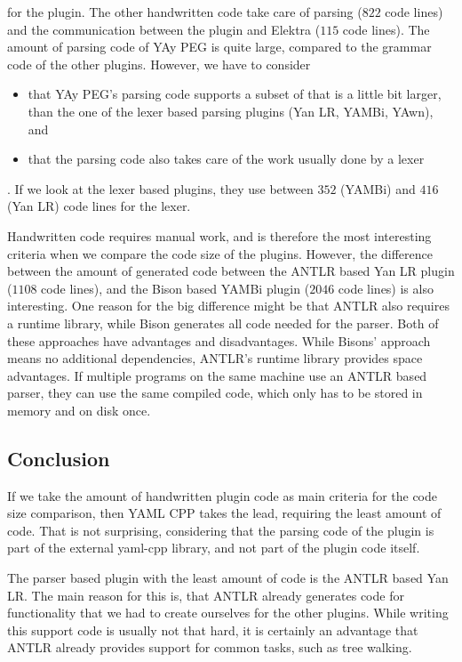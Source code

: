 for the plugin. The other handwritten code take care of parsing ($822$ code lines) and the communication between the plugin and Elektra ($115$ code lines). The amount of parsing code of YAy PEG is quite large, compared to the grammar code of the other plugins. However, we have to consider

\begin{itemize}
  \item that YAy PEG’s parsing code supports a subset of  that is a little bit larger, than the one of the lexer based parsing plugins (Yan LR, YAMBi, YAwn), and
  \item that the parsing code also takes care of the work usually done by a lexer
\end{itemize}

. If we look at the lexer based plugins, they use between $352$ (YAMBi) and $416$ (Yan LR) code lines for the lexer.

Handwritten code requires manual work, and is therefore the most interesting criteria when we compare the code size of the plugins. However, the difference between the amount of generated code between the ANTLR based Yan LR plugin ($1108$ code lines), and the Bison based YAMBi plugin ($2046$ code lines) is also interesting. One reason for the big difference might be that ANTLR also requires a runtime library, while Bison generates all code needed for the parser. Both of these approaches have advantages and disadvantages. While Bisons’ approach means no additional dependencies, ANTLR’s runtime library provides space advantages. If multiple programs on the same machine use an ANTLR based parser, they can use the same compiled code, which only has to be stored in memory and on disk once.

\subsection{Conclusion}

If we take the amount of handwritten plugin code as main criteria for the code size comparison, then YAML CPP takes the lead, requiring the least amount of code. That is not surprising, considering that the parsing code of the plugin is part of the external yaml-cpp library, and not part of the plugin code itself.

The parser based plugin with the least amount of code is the ANTLR based Yan LR. The main reason for this is, that ANTLR already generates code for functionality that we had to create ourselves for the other plugins. While writing this support code is usually not that hard, it is certainly an advantage that ANTLR already provides support for common tasks, such as tree walking.

